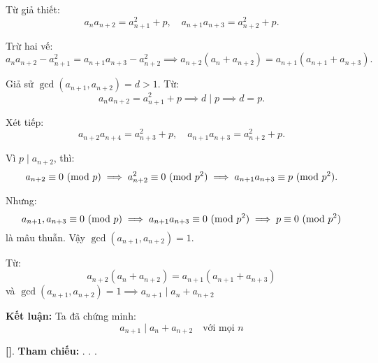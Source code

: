 \documentclass[../2015-n-s.tex]{subfiles}
\begin{document}
\begin{soln}
	Từ giả thiết:
	\[
		a_n a_{n+2} = a_{n+1}^2 + p,\quad a_{n+1} a_{n+3} = a_{n+2}^2 + p.
	\]

	Trừ hai vế:
	\[
		a_n a_{n+2} - a_{n+1}^2 = a_{n+1} a_{n+3} - a_{n+2}^2 \implies
		a_{n+2}(a_n + a_{n+2}) = a_{n+1}(a_{n+1} + a_{n+3}).
	\]

	Giả sử \( \gcd(a_{n+1}, a_{n+2}) = d > 1 \). Từ:
	\[
		a_n a_{n+2} = a_{n+1}^2 + p \implies d \mid p \implies d = p.
	\]

	Xét tiếp:
	\[
		a_{n+2} a_{n+4} = a_{n+3}^2 + p,\quad a_{n+1} a_{n+3} = a_{n+2}^2 + p.
	\]

	Vì \( p \mid a_{n+2} \), thì:
	\[
		a_{n+2} \equiv 0 \ (\mathrm{mod}\ p) \implies a_{n+2}^2 \equiv 0 \ (\mathrm{mod}\ p^2)
	\implies a_{n+1} a_{n+3} \equiv p \ (\mathrm{mod}\ p^2).
	\]

	Nhưng:
	\[
		a_{n+1}, a_{n+3} \equiv 0 \ (\mathrm{mod}\ p) \implies a_{n+1} a_{n+3} \equiv 0 \ (\mathrm{mod}\ p^2)
	\implies p \equiv 0 \ (\mathrm{mod}\ p^2)
	\]
	là mâu thuẫn. Vậy \( \gcd(a_{n+1}, a_{n+2}) = 1 \).

	Từ:
	\[
		a_{n+2}(a_n + a_{n+2}) = a_{n+1}(a_{n+1} + a_{n+3})
	\]
	và \( \gcd(a_{n+1}, a_{n+2}) = 1 \implies a_{n+1} \mid a_n + a_{n+2} \)

	\textbf{Kết luận:} Ta đã chứng minh:
	\[
		\boxed{a_{n+1} \mid a_n + a_{n+2} \quad \text{với mọi } n}
	\]

	\vspace{1em}
	\textbf{[]}.
	\textbf{Tham chiếu:} . . .
\end{soln}

\end{document}
